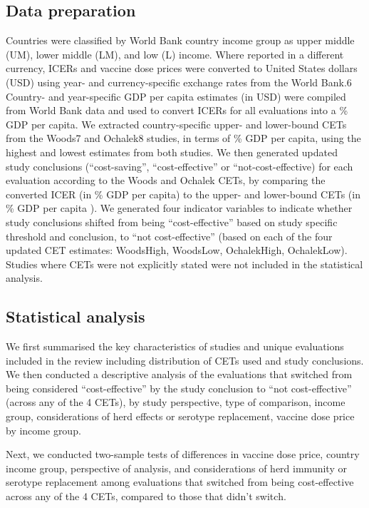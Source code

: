 \documentclass[12pt]{article}
\begin{document}
\subsection{Data preparation}
Countries were classified by World Bank country income group as upper middle (UM), lower middle (LM), and low (L) income. Where reported in a different currency, ICERs and vaccine dose prices were converted to United States dollars (USD) using year- and currency-specific exchange rates from the World Bank.6 Country- and year-specific GDP per capita estimates (in USD) were compiled from World Bank data and used to convert ICERs for all evaluations into a \% GDP per capita. We extracted country-specific upper- and lower-bound CETs from the Woods7 and Ochalek8 studies, in terms of \% GDP per capita, using the highest and lowest estimates from both studies. We then generated updated study conclusions (“cost-saving”, “cost-effective” or “not-cost-effective) for each evaluation according to the Woods and Ochalek CETs, by comparing the converted ICER (in \% GDP per capita) to the upper- and lower-bound CETs (in \% GDP per capita ). We generated four indicator variables to indicate whether study conclusions shifted from being “cost-effective” based on study specific threshold and conclusion, to “not cost-effective” (based on each of the four updated CET estimates: WoodsHigh, WoodsLow, OchalekHigh, OchalekLow). Studies where CETs were not explicitly stated were not included in the statistical analysis.

\subsection{Statistical analysis}
We first summarised the key characteristics of studies and unique evaluations included in the review including distribution of CETs used and study conclusions. We then conducted a descriptive analysis of the evaluations that switched from being considered “cost-effective” by the study conclusion to “not cost-effective” (across any of the 4 CETs), by study perspective, type of comparison, income group, considerations of herd effects or serotype replacement, vaccine dose price by income group.

Next, we conducted two-sample tests of differences in vaccine dose price, country income group, perspective of analysis, and considerations of herd immunity  or serotype replacement among evaluations that switched from being cost-effective across any of the 4 CETs, compared to those that didn’t switch.
\end{document}
